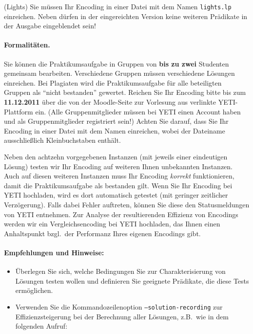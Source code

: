 \documentclass[a4paper,12pt,ngerman]{article}
\begin{document}
\begin{PraktikumsAufgabe}{1}{(Lights)}
\noindent
{\small\sf Sie m\"ussen Ihr Encoding in einer Datei mit dem Namen \texttt{lights.lp}
           einreichen.
           Neben  d\"urfen in der eingereichten Version keine weiteren
           Pr\"adikate in der Ausgabe eingeblendet sein!}

\noindent


\noindent

\paragraph{Formalitäten.}
%
Sie können die Praktikumsaufgabe in Gruppen von \textbf{bis zu zwei} Studenten gemeinsam bearbeiten.
Verschiedene Gruppen müssen verschiedene Lösungen einreichen.
Bei Plagiaten wird die Praktikumsaufgabe für alle beteiligten Gruppen als ``nicht bestanden'' gewertet.
Reichen Sie Ihr Encoding bitte bis zum \textbf{11.12.2011}
über die von der Moodle-Seite zur Vorlesung aus verlinkte YETI-Plattform ein.
(Alle Gruppenmitglieder müssen bei YETI einen Account haben und als 
 Gruppenmitglieder registriert sein!)
Achten Sie darauf, dass Sie Ihr Encoding in einer Datei mit dem Namen  einreichen,
wobei der Dateiname ausschließlich Kleinbuchstaben enthält.

\noindent
Neben den achtzehn vorgegebenen Instanzen (mit jeweils einer eindeutigen L\"osung)
testen wir Ihr Encoding auf weiteren Ihnen unbekannten Instanzen.
Auch auf diesen weiteren Instanzen muss Ihr Encoding \emph{korrekt} funktionieren,
damit die Praktikumsaufgabe als bestanden gilt.
Wenn Sie Ihr Encoding bei YETI hochladen, wird es dort automatisch getestet
(mit geringer zeitlicher Verz\"ogerung).
Falls dabei Fehler auftreten, k\"onnen Sie diese den Statusmeldungen von YETI entnehmen.
Zur Analyse der resultierenden Effizienz von Encodings werden wir ein Vergleichsencoding 
bei YETI hochladen, das Ihnen einen Anhalts\-punkt bzgl.\ der Performanz Ihres
eigenen Encodings gibt.



\paragraph{Empfehlungen und Hinweise:}%
\begin{itemize}
\item Überlegen Sie sich, welche Bedingungen Sie zur Charakterisierung von L\"osungen
      testen wollen und definieren Sie geeignete Pr\"adikate, die diese Tests erm\"oglichen.
\item Verwenden Sie die Kommandozeilenoption \texttt{--solution-recording} zur
      Effizienz\-steigerung bei der Berechnung aller L\"osungen, z.B.\ wie in dem folgenden Aufruf:


\end{itemize}
\end{PraktikumsAufgabe}
\end{document}
